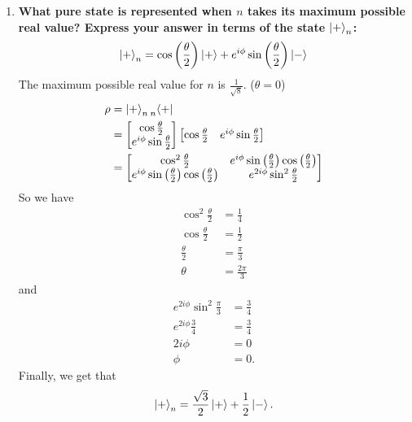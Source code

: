 \documentclass[11pt]{article}
\DeclarePairedDelimiter\abs{\lvert}{\rvert}
\begin{document}
\begin{enumerate}[label=\textbf{\arabic*.}, start=3]
{\begin{enumerate}[label=\textbf{(\alph*)}]
{\begin{align*}
                        \abs{n}^2&=\frac 1 8 \\
                        n&=\frac{1}{\sqrt 8}e^{i\theta}
                    \end{align*}
                    \(\theta\) is some angle.
                }
                \item{
                    \textbf{\boldmath What pure state is represented when \(n\) takes its maximum possible real value? Express your answer in terms of the state \(\ket{+}_n\): \[\ket{+}_n=\cos\left(\frac \theta 2\right)\ket{+}+e^{i\phi}\sin\left(\frac \theta 2\right)\ket{-}\]}
                    The maximum possible real value for \(n\) is \(\frac{1}{\sqrt 8}\). (\(\theta=0\))
                    \begin{align*}
                        \rho&=\ket{+}_n\prescript{}{n}{\bra{+}} \\
                        &=\begin{bmatrix}\cos\frac \theta 2 \\ e^{i\phi}\sin\frac \theta 2\end{bmatrix}\begin{bmatrix}\cos\frac \theta 2 & e^{i\phi}\sin\frac \theta 2\end{bmatrix} \\
                        &=\begin{bmatrix}\cos^2\frac \theta 2 & e^{i\phi}\sin\left(\frac \theta 2\right)\cos\left(\frac \theta 2\right) \\ e^{i\phi}\sin\left(\frac \theta 2\right)\cos\left(\frac \theta 2\right) & e^{2i\phi}\sin^2\frac \theta 2\end{bmatrix}
                    \end{align*}
                    So we have
                    \begin{align*}
                        \cos^2\frac \theta 2&=\frac 1 4 \\
                        \cos\frac \theta 2&=\frac 1 2 \\
                        \frac \theta 2&=\frac\pi 3 \\
                        \theta&=\frac{2\pi}{3}
                    \end{align*}
                    and
                    \begin{align*}
                        e^{2i\phi}\sin^2\frac\pi 3&=\frac 3 4 \\
                        e^{2i\phi}\frac 3 4&=\frac 3 4\\
                        2i\phi&=0 \\
                        \phi&=0.
                    \end{align*}
                    Finally, we get that
                    \[\ket{+}_n=\frac{\sqrt 3}{2}\ket{+}+\frac 1 2\ket{-}.\]
                }
            \end{enumerate}
        }
    \end{enumerate}
\end{document}
